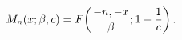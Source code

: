 \[\mathop{M_{n}\/}\nolimits\!\left(x;\beta,c\right)=\mathop{F\/}\nolimits\!\left%
({-n,-x\atop\beta};1-\frac{1}{c}\right).\]